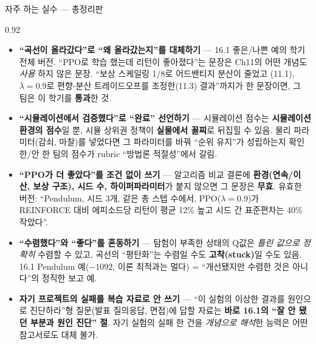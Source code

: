 \begin{frame}{자주 하는 실수 — 총정리판}
\begin{center}\begin{varwidth}{0.92\textwidth}
  \small
  \begin{itemize}
    \item \textbf{``곡선이 올라갔다''로 ``왜 올라갔는지''를
      대체하기} — 16.1 좋은/나쁜 예의 학기 전체 버전. ``PPO로 학습
      했는데 리턴이 좋아졌다''는 문장은 Ch11의 어떤 개념도 \emph{사용}
      하지 않은 문장. ``보상 스케일링 1/8로 어드밴티지 분산이 줄었고
      (11.1), $\lambda=0.9$로 편향-분산 트레이드오프를 조정한(11.3)
      결과''까지가 한 문장이면, 그 팀은 이 학기를 \textbf{통과}한
      것.
    \item \textbf{``시뮬레이션에서 검증했다''로 ``완료'' 선언하기} —
      시뮬레이션 점수는 \textbf{시뮬레이션 환경의 점수}일 뿐, 시뮬
      상위권 정책이 \textbf{실물에서 꼴찌}로 뒤집힐 수 있음.
      물리 파라미터(감쇠, 마찰)를 넣었다면 그 파라미터를 바꿔 ``순위
      유지''가 성립하는지 확인한/안 한 팀의 점수가 rubric ``방법론
      적절성''에서 갈림.
    \item \textbf{``PPO가 더 좋았다''를 조건 없이 쓰기} — 알고리즘
      비교 결론에 \textbf{환경(연속/이산, 보상 구조), 시드 수,
      하이퍼파라미터}가 붙지 않으면 그 문장은 \textbf{무효}. 유효한
      버전: ``Pendulum, 시드 3개, 같은 총 스텝 수에서, PPO($\lambda
      =0.9$)가 REINFORCE 대비 에피소드당 리턴이 평균 12\% 높고 시드
      간 표준편차는 40\% 작았다''.
    \item \textbf{``수렴했다''와 ``좋다''를 혼동하기} — 탐험이
      부족한 상태의 Q값은 \emph{틀린 값으로 정확히} 수렴할 수 있고,
      곡선의 ``평탄화''는 수렴일 수도 \textbf{고착(stuck)}일 수도
      있음. 16.1 Pendulum 예($-1092$, 이론 최적과는 멀다) =
      ``개선됐지만 수렴한 것은 아니다''의 정직한 보고 예.
    \item \textbf{자기 프로젝트의 실패를 복습 자료로 안 쓰기} —
      ``이 실험의 이상한 결과를 원인으로 진단하라''형 질문(발표
      질의응답, 면접)에 답할 자료는 \textbf{바로 16.1의 ``잘 안
      됐던 부분과 원인 진단'' 절}. 자기 실험의 실패 한 건을
      \emph{개념으로 해석}한 능력은 어떤 참고서로도 대체 불가.
  \end{itemize}
\end{varwidth}\end{center}
\end{frame}
